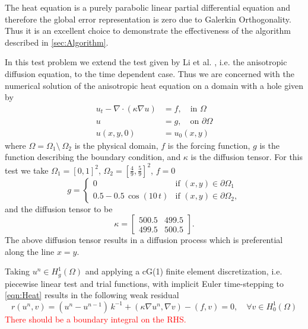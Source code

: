 \begin{test} \label{tst:Heat}
  The heat equation is a purely parabolic linear partial differential equation
  and therefore the global error representation is zero due to Galerkin
  Orthogonality.  Thus it is an excellent choice to demonstrate the
  effectiveness of the algorithm described in \autoref{sec:Algorithm}.

  In this test problem we extend the test given by Li et al.
  \cite[Example 5.1]{Li2010}, i.e. the anisotropic diffusion equation, to the
  time dependent case. Thus we are concerned with the numerical solution of the
  anisotropic heat equation on a domain with a hole given by
  \begin{equation} \label{eqn:Heat}
    \begin{split}
      u_t - \nabla \cdot (\kappa \nabla u) &= f, \quad \text{in } \Omega \\
      u &= g, \quad \text{on } \partial \Omega \\
      u(x,y,0) &= u_0(x,y)
    \end{split}
  \end{equation}
  where $\Omega = \Omega_1\setminus~\Omega_2$ is the physical domain, $f$ is the
  forcing function, $g$ is the function describing the boundary condition, and
  $\kappa$ is the diffusion tensor. For this test we take $\Omega_1 = [0,
  1]^2$, $\Omega_2 = [\frac{4}{9}, \frac{5}{9}]^2$, $f = 0$
  \begin{equation}
    g = \begin{cases}
        0 & \text{if } (x,y) \in \partial \Omega_1 \\
        0.5 - 0.5\, \cos(10\, t) & \text{if } (x,y) \in \partial \Omega_2,
    \end{cases}
    \label{eqn:BCFunction}
  \end{equation}
  and the diffusion tensor to be
  \begin{equation}
    \kappa = \begin{bmatrix} 500.5 & 499.5 \\ 499.5 & 500.5 \end{bmatrix}.
    \label{eqn:DiffusionTensor}
  \end{equation}
  The above diffusion tensor results in a diffusion process which is
  preferential along the line $x = y$.

  Taking $u^n \in H^1_g(\Omega)$ and applying a cG(1) finite element
  discretization, i.e. piecewise linear test and trial functions, with implicit
  Euler time-stepping to \eqref{eqn:Heat} results in the following weak residual
  \begin{equation}
    r(u^n, v) = (u^n - u^{n-1})\, k^{-1} + (\kappa \nabla u^n, \nabla v) 
      - (f, v) = 0, \quad \forall v \in H^1_0(\Omega)
    \label{eqn:HeatWeak}
  \end{equation}
  \textcolor{red}{There should be a boundary integral on the RHS.}
\end{test}

